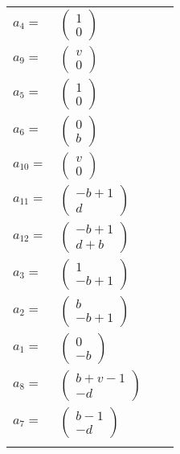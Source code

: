 \documentclass[1p]{elsarticle_modified}
\theoremstyle{definition}
\begin{document}
\begin{tabular}{m{7pt} m{180pt} m{7pt} m{180pt} }
\flushright $a_{4}=$&$\begin{pmatrix}1\\0\end{pmatrix}$ \\
\flushright $a_{9}=$&$\begin{pmatrix}v\\0\end{pmatrix}$ \\
\flushright $a_{5}=$&$\begin{pmatrix}1\\0\end{pmatrix}$ \\
\flushright $a_{6}=$&$\begin{pmatrix}0\\b\end{pmatrix}$ \\
\flushright $a_{10}=$&$\begin{pmatrix}v\\0\end{pmatrix}$ \\
\flushright $a_{11}=$&$\begin{pmatrix}- b+1\\d\end{pmatrix}$ \\
\flushright $a_{12}=$&$\begin{pmatrix}- b+1\\d+b\end{pmatrix}$ \\
\flushright $a_{3}=$&$\begin{pmatrix}1\\- b+1\end{pmatrix}$ \\
\flushright $a_{2}=$&$\begin{pmatrix}b\\- b+1\end{pmatrix}$ \\
\flushright $a_{1}=$&$\begin{pmatrix}0\\- b\end{pmatrix}$ \\
\flushright $a_{8}=$&$\begin{pmatrix}b+v-1\\- d\end{pmatrix}$ \\
\flushright $a_{7}=$&$\begin{pmatrix}b-1\\- d\end{pmatrix}$\\&\end{tabular}
\end{document}
